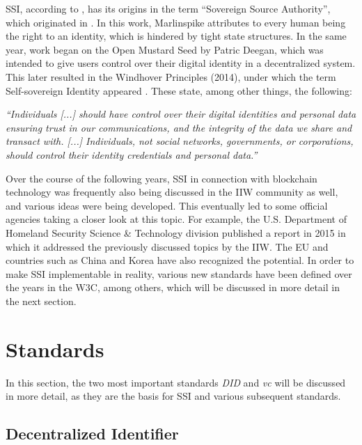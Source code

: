 	    SSI, according to \cite{allen_path_2016}, has its origins in the term “Sovereign Source Authority”, which originated in \cite{marlinspike_what_2012}. In this work, Marlinspike attributes to every human being the right to an identity, which is hindered by tight state structures. In the same year, work began on the Open Mustard Seed by Patric Deegan, which was intended to give users control over their digital identity in a decentralized system. This later resulted in the Windhover Principles (2014), under which the term Self-sovereign Identity appeared \cite{idcubedorg_id3_2014, hub_culture_hubid_2014}. These state, among other things, the following: \cite{allen_path_2016}
	    
	    \begin{displayquote}
            \textit{“Individuals [...] should have control over their digital identities and personal data ensuring trust in our communications, and the integrity of the data we share and transact with. [...] Individuals, not social networks, governments, or corporations, should control their identity credentials and personal data.”}
        \end{displayquote}
        
        Over the course of the following years, \ac{SSI} in connection with blockchain technology was frequently also being discussed in the \ac{IIW} community as well, and various ideas were being developed. This eventually led to some official agencies taking a closer look at this topic. For example, the U.S. Department of Homeland Security Science \& Technology division published a report in 2015 in which it addressed the previously discussed topics by the \ac{IIW}. The EU and countries such as China and Korea have also recognized the potential. In order to make \ac{SSI} implementable in reality, various new standards have been defined over the years in the W3C, among others, which will be discussed in more detail in the next section. \cite[p. 6]{preukschat_self-sovereign_2021}
        
   	\section{Standards}\label{section: standards}
	    In this section, the two most important standards \textit{\acf{DID}} and \textit{\acf{vc}} will be discussed in more detail, as they are the basis for \ac{SSI} and various subsequent standards.
        
	    \subsection{Decentralized Identifier}\label{subsection: did}
	    
